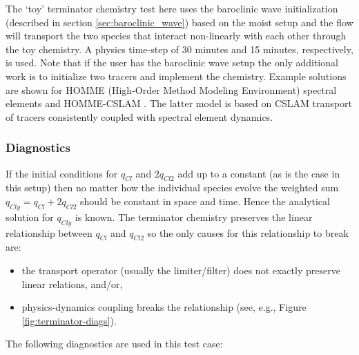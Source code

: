 \documentclass[times,doublespace]{fldauth}
\begin{document}
The `toy' terminator chemistry test here uses the baroclinic wave initialization (described in section \ref{sec:baroclinic_wave}) based on the moist setup and the flow will transport the two species that interact non-linearly with each other through the toy chemistry. A physics time-step of 30 minutes and 15 minutes, respectively, is used. Note that if the user has the baroclinic wave setup the only additional work is to initialize two tracers and implement the chemistry. Example solutions are shown for HOMME (High-Order Method Modeling Environment) \cite{DetAl2012IJHPCA} spectral elements and HOMME-CSLAM \cite{LetAl2016MWR}. The latter model is based on CSLAM \cite{LNU2010JCP} transport of tracers consistently coupled with spectral element dynamics.

\subsubsection{Diagnostics}
If the initial conditions for $q_{Cl}$ and $2q_{Cl2}$ add up to a constant (as is the case in this setup) then no matter how the individual species evolve the weighted sum $q_{Cly}=q_{Cl}+2q_{Cl2}$ should be constant in space and time. Hence the analytical solution for $q_{Cly}$ is known. The terminator chemistry preserves the linear relationship between $q_{Cl}$ and $q_{Cl2}$ so the only causes for this relationship to break are:
\begin{itemize}
\item the transport operator (usually the limiter/filter) does not exactly preserve linear relations, and/or,
\item physics-dynamics coupling breaks the relationship (see, e.g., Figure \ref{fig:terminator-diags}).
\end{itemize}
The following diagnostics are used in this test case:
\end{document}
